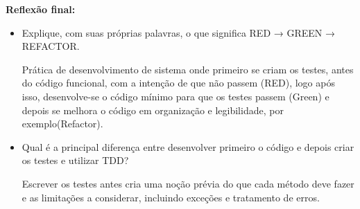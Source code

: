 \Large{\textbf{Reflexão final:}}
\begin{itemize}
    \item Explique, com suas próprias palavras, o que significa RED → GREEN → REFACTOR.
    
    Prática de desenvolvimento de sistema onde primeiro se criam os testes, antes do código funcional, com a intenção de que não passem (RED), logo após isso, desenvolve-se o código mínimo para que os testes passem (Green) e depois se melhora o código em organização e legibilidade, por exemplo(Refactor).

    \item Qual é a principal diferença entre desenvolver primeiro o código e depois criar os testes
e utilizar TDD?
    
    Escrever os testes antes cria uma noção prévia do que cada método deve fazer e as limitações a considerar, incluindo exceções e tratamento de erros.

\end{itemize}